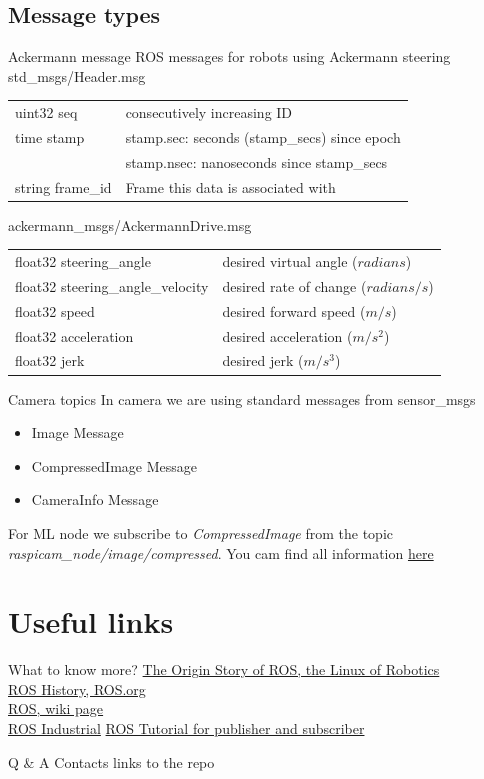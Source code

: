 \documentclass{beamer}
\begin{document}
\subsection{Message types}
\begin{frame}{Ackermann message}
ROS messages for robots using Ackermann steering
\vfill
std\_msgs/Header.msg\\
\begin{tabular}{l|l}
uint32 seq & consecutively increasing ID\\
time stamp & stamp.sec: seconds (stamp\_secs) since epoch\\
           & stamp.nsec: nanoseconds since stamp\_secs\\
string frame\_id & Frame this data is associated with\\
\end{tabular}
\vfill
ackermann\_msgs/AckermannDrive.msg\\
\begin{tabular}{l|l}
float32 steering\_angle & desired virtual angle ($radians$)\\
float32 steering\_angle\_velocity & desired rate of change ($radians/s$)\\
float32 speed & desired forward speed ($m/s$)\\
float32 acceleration & desired acceleration ($m/s^2$)\\
float32 jerk & desired jerk ($m/s^3$)\\
\end{tabular}
\end{frame}

\begin{frame}{Camera topics}
In camera we are using standard messages from sensor\_msgs
\begin{itemize}
\item Image Message
\item CompressedImage Message
\item CameraInfo Message
\end{itemize}
\vfill
For ML node we subscribe to \textit{CompressedImage} from the topic \textit{raspicam\_node/image/compressed}.
\vfill
You cam find all information \href{https://wiki.ros.org/sensor\_msgs}{here}
\end{frame}

\section{Useful links}

\begin{frame}{What to know more?}
\href{https://spectrum.ieee.org/automaton/robotics/robotics-software/the-origin-story-of-ros-the-linux-of-robotics}{The Origin Story of ROS, the Linux of Robotics}\\
\href{https://www.ros.org/history/}{ROS History, ROS.org}\\
\href{https://en.wikipedia.org/wiki/Robot_Operating_System}{ROS, wiki page}\\
\href{http://wiki.ros.org/Industrial/Tutorials}{ROS Industrial}
\href{https://wiki.ros.org/ROS/Tutorials/WritingPublisherSubscriber\%28python\%29}{ROS Tutorial for publisher and subscriber}
\end{frame}

\begin{frame}{Q \& A}
Contacts
links to the repo
\end{frame}
\end{document}
